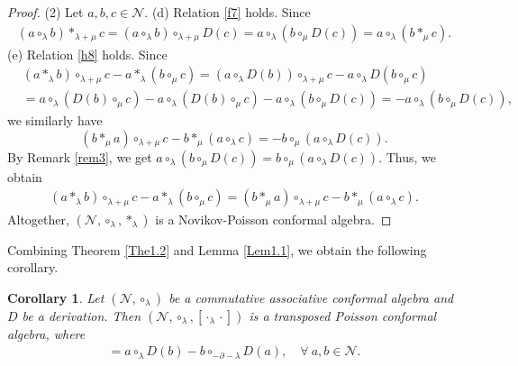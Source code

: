 \documentclass[11pt,letterpaper,reqno]{amsart}
\newtheorem{corollary}[theorem]{Corollary}
\theoremstyle{definition}
\numberwithin{equation}{section}
\begin{document}
\begin{proof}
(2) Let $a,b,c \in \mathcal{N}$. (d) Relation \eqref{f7} holds. Since
   \begin{align*}
      (a\circ_\lambda b)\ast_{\lambda+\mu}c=(a\circ_\lambda b)\circ_{\lambda+\mu}D(c)=a\circ_\lambda(b\circ_{\mu}D(c))=a\circ_\lambda(b\ast_{\mu}c).
   \end{align*}
(e) Relation \eqref{h8} holds. Since
   \begin{align*}
      &(a\ast_\lambda b)\circ_{\lambda+\mu}c-a\ast_\lambda(b\circ_\mu c)=(a\circ_\lambda D(b))\circ_{\lambda+\mu}c-a\circ_\lambda D(b\circ_\mu c) \\
      &=a\circ_\lambda (D(b)\circ_{\mu}c)-a\circ_\lambda (D(b)\circ_{\mu}c)-a\circ_\lambda (b\circ_{\mu}D(c))=-a\circ_\lambda (b\circ_{\mu}D(c)),
   \end{align*}
we similarly have
 $$(b\ast_\mu a)\circ_{\lambda+\mu}c-b\ast_\mu(a\circ_\lambda c)=-b\circ_\mu (a\circ_{\lambda}D(c)).$$
By Remark \ref{rem3}, we get $a\circ_\lambda (b\circ_{\mu}D(c))=b\circ_\mu (a\circ_{\lambda}D(c))$. Thus, we obtain
   \begin{align*}
      (a\ast_\lambda b)\circ_{\lambda+\mu}c-a\ast_\lambda(b\circ_\mu c)=(b\ast_\mu a)\circ_{\lambda+\mu}c-b\ast_\mu(a\circ_\lambda c).
   \end{align*}
Altogether, $(\mathcal{N} ,\circ_\lambda,\ast_\lambda)$ is a Novikov-Poisson conformal algebra.
\end{proof}

Combining Theorem \ref{The1.2} and Lemma \ref{Lem1.1}, we obtain the following corollary.

\begin{corollary}
   Let $(\mathcal{N} ,\circ_\lambda)$ be a commutative associative conformal algebra and $D$ be a derivation. Then $(\mathcal{N} ,\circ_\lambda,[\cdot_{\lambda}\cdot])$ is a transposed Poisson conformal algebra, where
   \begin{align}
      [a_{\lambda}b]=a\circ_\lambda D(b)-b\circ_{-\partial-\lambda} D(a), \quad \forall ~a,b \in \mathcal{N}.
   \end{align}
\end{corollary}
\end{document}

